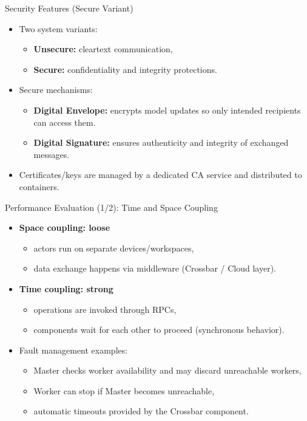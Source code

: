 \documentclass[aspectratio=169]{beamer}
\begin{document}
\begin{frame}{Security Features (Secure Variant)}
\begin{itemize}
  \item Two system variants:
  \begin{itemize}
    \item \textbf{Unsecure:} cleartext communication,
    \item \textbf{Secure:} confidentiality and integrity protections.
  \end{itemize}
  \item Secure mechanisms:
  \begin{itemize}
    \item \textbf{Digital Envelope:} encrypts model updates so only intended recipients can access them.
    \item \textbf{Digital Signature:} ensures authenticity and integrity of exchanged messages.
  \end{itemize}
  \item Certificates/keys are managed by a dedicated CA service and distributed to containers.
\end{itemize}
\end{frame}

\begin{frame}{Performance Evaluation (1/2): Time and Space Coupling}
\begin{itemize}
  \item \textbf{Space coupling: loose}
  \begin{itemize}
    \item actors run on separate devices/workspaces,
    \item data exchange happens via middleware (Crossbar / Cloud layer).
  \end{itemize}
  \item \textbf{Time coupling: strong}
  \begin{itemize}
    \item operations are invoked through RPCs,
    \item components wait for each other to proceed (synchronous behavior).
  \end{itemize}
  \item Fault management examples:
  \begin{itemize}
    \item Master checks worker availability and may discard unreachable workers,
    \item Worker can stop if Master becomes unreachable,
    \item automatic timeouts provided by the Crossbar component.
  \end{itemize}
\end{itemize}
\end{frame}
\end{document}
